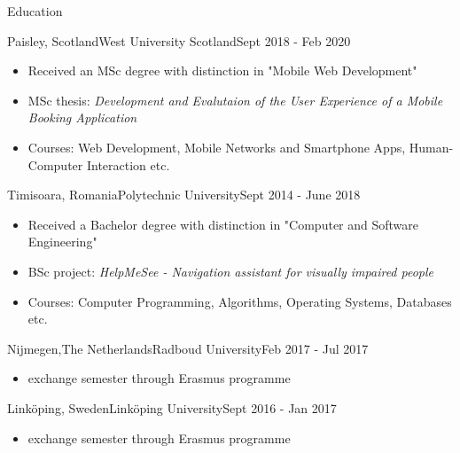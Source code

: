 \documentclass[]{mcdowellcv}
\begin{document}
	\begin{cvsection}{Education}
		\begin{cvsubsection}{Paisley, Scotland}{West University Scotland}{Sept 2018 - Feb 2020}
      \begin{itemize}
        \item Received an MSc degree with distinction in "Mobile Web Development"
        \item MSc thesis: \textit{Development and Evalutaion of the User Experience of a Mobile Booking Application}
				\item Courses: Web Development, Mobile Networks and Smartphone Apps, Human-Computer Interaction etc.
			\end{itemize}
		\end{cvsubsection}

		\begin{cvsubsection}{Timisoara, Romania}{Polytechnic University}{Sept 2014 - June 2018}
			\begin{itemize}
				\item Received a Bachelor degree with distinction in "Computer and Software Engineering"
				\item BSc project: \textit{HelpMeSee - Navigation assistant for visually impaired people}
				\item Courses: Computer Programming, Algorithms, Operating Systems, Databases etc.
			\end{itemize}
		\end{cvsubsection}
	
		\begin{cvsubsection}{Nijmegen,The Netherlands}{Radboud University}{Feb 2017 - Jul 2017}
			\begin{itemize}
				\item exchange semester through Erasmus programme 
			\end{itemize}
		\end{cvsubsection}

		\begin{cvsubsection}{Linköping, Sweden}{Linköping University}{Sept 2016 - Jan 2017}
			\begin{itemize}
				\item exchange semester through Erasmus programme 
			\end{itemize}
		\end{cvsubsection}

	\end{cvsection}
	
\end{document}
